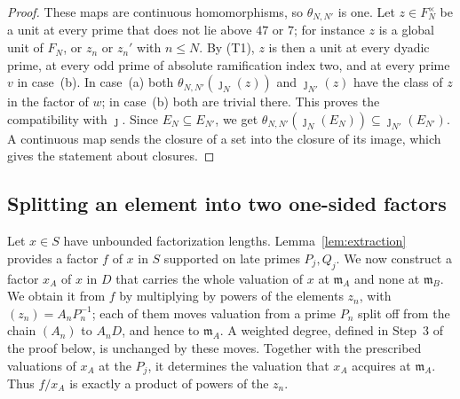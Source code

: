 \documentclass[11pt]{article}
\theoremstyle{plain}
\theoremstyle{definition}
\theoremstyle{remark}
\newcommand{\EA}{\mathfrak m_A}
\newcommand{\EB}{\mathfrak m_B}
\begin{document}
\begin{proof}
These maps are continuous homomorphisms, so $\theta_{N,N'}$ is one.  Let
$z\in F_N^\times$ be a unit at every prime that does not lie above $47$
or $7$; for instance $z$ is a global unit of $F_N$, or $z_n$ or $z_n'$
with $n\le N$.  By (T1), $z$ is then a unit at every dyadic prime, at
every odd prime of absolute ramification index two, and at every prime
$v$ in case~(b).  In case~(a) both
$\theta_{N,N'}(\jmath_N(z))$ and $\jmath_{N'}(z)$ have the class of $z$ in
the factor of $w$; in case~(b) both are trivial there.  This proves the
compatibility with $\jmath$.  Since $E_N\subseteq E_{N'}$, we get
$\theta_{N,N'}(\jmath_N(E_N))\subseteq\jmath_{N'}(E_{N'})$.  A continuous
map sends the closure of a set into the closure of its image, which gives
the statement about closures.
\end{proof}

\subsection{Splitting an element into two one-sided factors}
\label{sec:joint-split}

Let $x\in S$ have unbounded factorization lengths.
Lemma~\ref{lem:extraction} provides a factor $f$ of $x$ in $S$ supported
on late primes $P_j,Q_j$.  We now construct a factor $x_A$ of $x$ in $D$
that carries the whole valuation of $x$ at $\EA$ and none at $\EB$.  We
obtain it from $f$ by multiplying by powers of the elements $z_n$, with
$(z_n)=A_nP_n^{-1}$; each of them moves valuation from a prime $P_n$
split off from the chain $(A_n)$ to $A_nD$, and hence to $\EA$.  A
weighted degree, defined in Step~3 of the proof below, is unchanged by
these moves.  Together with the prescribed valuations of $x_A$ at the
$P_j$, it determines the valuation that $x_A$ acquires at $\EA$.  Thus $f/x_A$ is exactly a
product of powers of the $z_n$.
\end{document}
